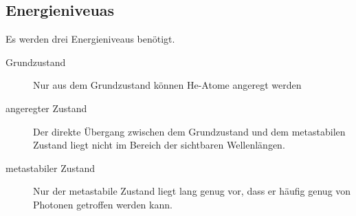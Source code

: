 \documentclass{article}
\begin{document}
\subsection{Energieniveuas}
Es werden drei Energieniveaus benötigt.
\begin{description}
 \item[Grundzustand] Nur aus dem Grundzustand können He-Atome angeregt werden
 \item[angeregter Zustand] Der direkte Übergang zwischen dem Grundzustand und dem metastabilen Zustand liegt nicht im Bereich der sichtbaren Wellenlängen.
 \item[metastabiler Zustand] Nur der metastabile Zustand liegt lang genug vor, dass er häufig genug von Photonen getroffen werden kann. 
\end{description}
\end{document}
